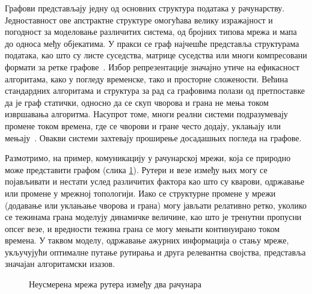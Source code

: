 
Графови представљају једну од основних структура података у рачунарству. Једноставност ове апстрактне структуре омогућава велику изражајност и погодност за моделовање различитих система, од бројних типова мрежа и мапа до односа међу објекатима. У пракси се граф најчешће представља структурама података, као што су листе суседства, матрице суседства или многи компресовани формати за ретке графове~\cite{vandergrinten_et_al:LIPIcs.SEA.2022.11}. Избор репрезентације значајно утиче на ефикасност алгоритама, како у погледу временске, тако и просторне сложености. Већина стандардних алгоритама и структура за рад са графовима полази од претпоставке да је граф статички, односно да се скуп чворова и грана не мења током извршавања алгоритма. Насупрот томе, многи реални системи подразумевају промене током времена, где се чворови и гране често додају, уклањају или мењају~\cite{APPLICATIONS_OF_DYNAMIC_GRAPH}. Овакви системи захтевају проширење досадашњих погледа на графове.

Размотримо, на пример, комуникацију у рачунарској мрежи, која се природно може представити графом (слика \ref{fig:network}). Рутери и везе између њих могу се појављивати и нестати услед различитих фактора као што су кварови, одржавање или промене у мрежној топологији. Иако се структурне промене у мрежи (додавање или уклањање чворова и грана) могу јављати релативно ретко, уколико се тежинама грана моделују динамичке величине, као што је тренутни пропусни опсег везе, и вредности тежина грана се могу мењати континуирано током времена. У таквом моделу, одржавање ажурних информација о стању мреже, укључујући оптималне путање рутирања и друга релевантна својства, представља значајан алгоритамски изазов.

\begin{figure}[ht]
\centering
\begingroup
{}
\endgroup
\caption{Неусмерена мрежа рутера између два рачунара}
\label{fig:network}
\end{figure}

